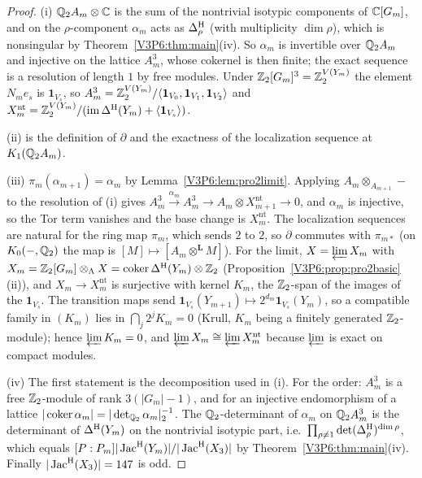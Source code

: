 \begin{proof}
(i) $\mathbb{Q}_2A_m\otimes\mathbb{C}$ is the sum of the nontrivial isotypic components of $\mathbb{C}[G_m]$, and on the
$\rho$-component $\alpha_m$ acts as $\Delta^{\mathrm{H}}_\rho$ (with multiplicity $\dim\rho$), which is
nonsingular by Theorem~\ref{V3P6:thm:main}(iv). So $\alpha_m$ is invertible over $\mathbb{Q}_2A_m$ and
injective on the lattice $A_m^{3}$, whose cokernel is then finite; the exact sequence is a
resolution of length $1$ by free modules. Under $\mathbb{Z}_2[G_m]^{3}=\mathbb{Z}_2^{V(Y_m)}$ the element $N_me_s$
is $\mathbf 1_{V_s}$, so $A_m^{3}=\mathbb{Z}_2^{V(Y_m)}/\langle\mathbf 1_{V_0},\mathbf 1_{V_1},\mathbf 1_{V_2}\rangle$
and $X_m^{\mathrm{nt}}=\mathbb{Z}_2^{V(Y_m)}/(\operatorname{im}\Delta^{\mathrm{H}}(Y_m)+\langle\mathbf 1_{V_s}\rangle)$.

(ii) is the definition of $\partial$ and the exactness of the localization sequence at
$K_1(\mathbb{Q}_2A_m)$.

(iii) $\pi_m(\alpha_{m+1})=\alpha_m$ by Lemma~\ref{V3P6:lem:pro2limit}. Applying
$A_m\otimes_{A_{m+1}}-$ to the resolution of (i) gives $A_m^{3}\xrightarrow{\alpha_m}A_m^{3}\to
A_m\otimes X_{m+1}^{\mathrm{nt}}\to0$, and $\alpha_m$ is injective, so the Tor term vanishes and
the base change is $X_m^{\mathrm{nt}}$. The localization sequences are natural for the ring map
$\pi_m$, which sends $2$ to $2$, so $\partial$ commutes with $\pi_{m*}$ (on $K_0(-,\mathbb{Q}_2)$ the map is
$[M]\mapsto[A_m\otimes^{\mathbf L}M]$). For the limit, $X=\varprojlim X_m$ with
$X_m=\mathbb{Z}_2[G_m]\otimes_\Lambda X=\operatorname{coker}\Delta^{\mathrm{H}}(Y_m)\otimes\mathbb{Z}_2$
(Proposition~\ref{V3P6:prop:pro2basic}(ii)), and $X_m\to X_m^{\mathrm{nt}}$ is surjective with kernel
$K_m$, the $\mathbb{Z}_2$-span of the images of the $\mathbf 1_{V_s}$. The transition maps send
$\mathbf 1_{V_s}(Y_{m+1})\mapsto2^{d_m}\mathbf 1_{V_s}(Y_m)$, so a compatible family in $(K_m)$
lies in $\bigcap_j2^{j}K_m=0$ (Krull, $K_m$ being a finitely generated $\mathbb{Z}_2$-module); hence
$\varprojlim K_m=0$, and $\varprojlim X_m\cong\varprojlim X_m^{\mathrm{nt}}$ because $\varprojlim$
is exact on compact modules.

(iv) The first statement is the decomposition used in (i). For the order: $A_m^{3}$ is a free
$\mathbb{Z}_2$-module of rank $3(|G_m|-1)$, and for an injective endomorphism of a lattice
$|\operatorname{coker}\alpha_m|=|\det_{\mathbb{Q}_2}\alpha_m|_2^{-1}$. The $\mathbb{Q}_2$-determinant of $\alpha_m$ on
$\mathbb{Q}_2A_m^{3}$ is the determinant of $\Delta^{\mathrm{H}}(Y_m)$ on the nontrivial isotypic part, i.e.\
$\prod_{\rho\ne1}\det(\Delta^{\mathrm{H}}_\rho)^{\dim\rho}$, which equals $[P:P_m]|\operatorname{Jac}^{\mathrm{H}}(Y_m)|/|\operatorname{Jac}^{\mathrm{H}}(X_3)|$
by Theorem~\ref{V3P6:thm:main}(iv). Finally $|\operatorname{Jac}^{\mathrm{H}}(X_3)|=147$ is odd.
\end{proof}


